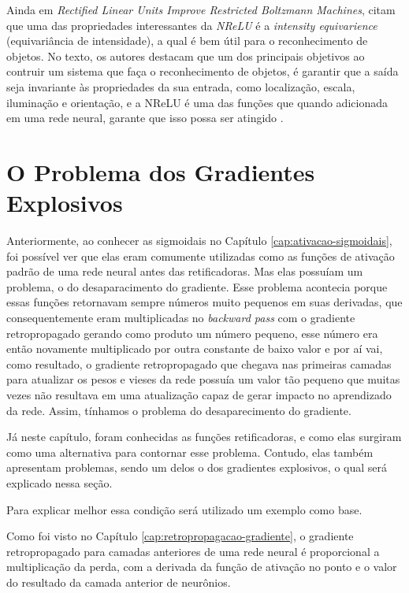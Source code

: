 Ainda em \textit{Rectified Linear Units Improve Restricted Boltzmann Machines}, \textcite{Nair2010} citam que uma das propriedades interessantes da \textit{NReLU} é a \textit{intensity equivarience} (equivariância de intensidade), a qual é bem útil para o reconhecimento de objetos. No texto, os autores destacam que um dos principais objetivos ao contruir um sistema que faça o reconhecimento de objetos, é garantir que a saída seja invariante às propriedades da sua entrada, como localização, escala, iluminação e orientação, e a NReLU é uma das funções que quando adicionada em uma rede neural, garante que isso possa ser atingido \parencite{Nair2010}.

\section{O Problema dos Gradientes Explosivos}

Anteriormente, ao conhecer as sigmoidais no Capítulo \ref{cap:ativacao-sigmoidais}, foi possível ver que elas eram comumente utilizadas como as funções de ativação padrão de uma rede neural antes das retificadoras. Mas elas possuíam um problema, o do desaparacimento do gradiente. Esse problema acontecia porque essas funções retornavam sempre números muito pequenos em suas derivadas, que consequentemente eram multiplicadas no \textit{backward pass} com o gradiente retropropagado gerando como produto um número pequeno, esse número era então novamente multiplicado por outra constante de baixo valor e por aí vai, como resultado, o gradiente retropropagado que chegava nas primeiras camadas para atualizar os pesos e vieses da rede possuía um valor tão pequeno que muitas vezes não resultava em uma atualização capaz de gerar impacto no aprendizado da rede. Assim, tínhamos o problema do desaparecimento do gradiente.

Já neste capítulo, foram conhecidas as funções retificadoras, e como elas surgiram como uma alternativa para contornar esse problema. Contudo, elas também apresentam problemas, sendo um delos o dos gradientes explosivos, o qual será explicado nessa seção.

Para explicar melhor essa condição será utilizado um exemplo como base.

Como foi visto no Capítulo \ref{cap:retropropagacao-gradiente}, o gradiente retropropagado para camadas anteriores de uma rede neural é proporcional a multiplicação da perda, com a derivada da função de ativação no ponto e o valor do resultado da camada anterior de neurônios. 

